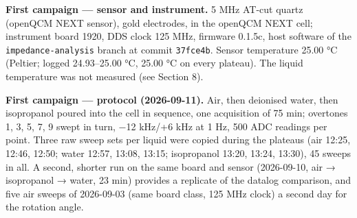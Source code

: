 \documentclass[11pt,a4paper]{article}
\begin{document}
\textbf{First campaign --- sensor and instrument.} 5 MHz AT-cut quartz
(openQCM NEXT sensor), gold electrodes, in the openQCM NEXT cell;
instrument board 1920, DDS clock 125 MHz, firmware 0.1.5c, host software
of the \texttt{impedance-analysis} branch at commit \texttt{37fce4b}.
Sensor temperature 25.00 °C (Peltier; logged 24.93--25.00 °C, 25.00 °C
on every plateau). The liquid temperature was not measured (see Section
8).

\textbf{First campaign --- protocol (2026-09-11).} Air, then deionised
water, then isopropanol poured into the cell in sequence, one
acquisition of 75 min; overtones 1, 3, 5, 7, 9 swept in turn, −12 kHz/+6
kHz at 1 Hz, 500 ADC readings per point. Three raw sweep sets per liquid
were copied during the plateaus (air 12:25, 12:46, 12:50; water 12:57,
13:08, 13:15; isopropanol 13:20, 13:24, 13:30), 45 sweeps in all. A
second, shorter run on the same board and sensor (2026-09-10, air →
isopropanol → water, 23 min) provides a replicate of the datalog
comparison, and five air sweeps of 2026-09-03 (same board class, 125 MHz
clock) a second day for the rotation angle.
\end{document}
